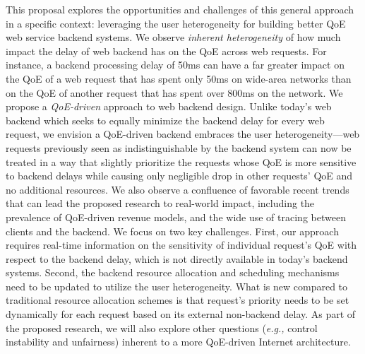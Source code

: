 \documentclass{proposalnsf}
\newcommand{\eg}{{\it e.g.,}\xspace}
\begin{document}
This proposal explores the opportunities and challenges of this general approach in a specific context: leveraging the user heterogeneity for building better QoE web service backend systems.
We observe {\em inherent heterogeneity} of how much impact the delay of web backend has on the QoE across web requests.
For instance, a backend processing delay of 50ms can have a far greater impact on the QoE of a web request that has spent only 50ms on wide-area networks than on the QoE of another request that has spent over 800ms on the network.
We propose a {\em QoE-driven} approach to web backend design.
Unlike today's web backend which seeks to equally minimize the backend delay for every web request, we envision a QoE-driven backend embraces the user heterogeneity---web requests previously seen as indistinguishable by the backend system can now be treated in a way that slightly prioritize the requests whose QoE is more sensitive to backend delays while causing only negligible drop in other requests' QoE and no additional resources.
We also observe a confluence of favorable recent trends that can lead the proposed research to real-world impact, including the prevalence of QoE-driven revenue models, and the wide use of tracing between clients and the backend.
We focus on two key challenges.
First, our approach requires real-time information on the sensitivity of individual request's QoE with respect to the backend delay, which is not directly available in today's backend systems.
Second, the backend resource allocation and scheduling mechanisms need to be updated to utilize the user heterogeneity. What is new compared to traditional resource allocation schemes is that request's priority needs to be set dynamically for each request based on its external non-backend delay.
As part of the proposed research, we will also explore other questions (\eg control instability and unfairness) inherent to a more QoE-driven Internet architecture.
\end{document}

